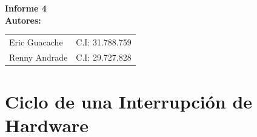 \documentclass[12pt,a4paper]{article}
\begin{document}
	
	\begin{titlepage}
		\centering
		\vspace*{6cm}
		
		{\Huge \bfseries Informe 4} \\[3cm]
		
		{\Large \bfseries Autores:} \\[0.5cm]
		\begin{tabular}{ll}
			Eric Guacache & C.I: 31.788.759 \\
			Renny Andrade & C.I: 29.727.828 \\
		\end{tabular}
		
		\vfill
	\end{titlepage}
	
	\newpage
	
	\tableofcontents
	\newpage
	
	
	\section{Ciclo de una Interrupción de Hardware}
	
\end{document}
